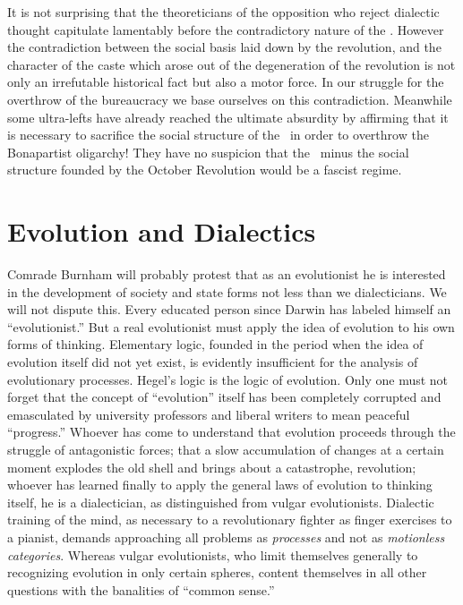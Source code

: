 It is not surprising that the theoreticians of the opposition who reject dialectic thought capitulate lamentably before the contradictory nature of the \USSR. However the contradiction between the social basis laid down by the revolution, and the character of the caste which arose out of the degeneration of the revolution is not only an irrefutable historical fact but also a motor force. In our struggle for the overthrow of the bureaucracy we base ourselves on this contradiction. Meanwhile some ultra-lefts have already reached the ultimate absurdity by affirming that it is necessary to sacrifice the social structure of the \USSR\ in order to overthrow the Bonapartist oligarchy! They have no suspicion that the \USSR\ minus the social structure founded by the October Revolution would be a fascist regime.

\section*{Evolution and Dialectics}

Comrade Burnham will probably protest that as an evolutionist he is interested in the development of society and state forms not less than we dialecticians. We will not dispute this. Every educated person since Darwin has labeled himself an “evolutionist.” But a real evolutionist must apply the idea of evolution to his own forms of thinking. Elementary logic, founded in the period when the idea of evolution itself did not yet exist, is evidently insufficient for the analysis of evolutionary processes. Hegel’s logic is the logic of evolution. Only one must not forget that the concept of “evolution” itself has been completely corrupted and emasculated by university professors and liberal writers to mean peaceful “progress.” Whoever has come to understand that evolution proceeds through the struggle of antagonistic forces; that a slow accumulation of changes at a certain moment explodes the old shell and brings about a catastrophe, revolution; whoever has learned finally to apply the general laws of evolution to thinking itself, he is a dialectician, as distinguished from vulgar evolutionists. Dialectic training of the mind, as necessary to a revolutionary fighter as finger exercises to a pianist, demands approaching all problems as \emph{processes} and not as \emph{motionless categories}. Whereas vulgar evolutionists, who limit themselves generally to recognizing evolution in only certain spheres, content themselves in all other questions with the banalities of “common sense.”

